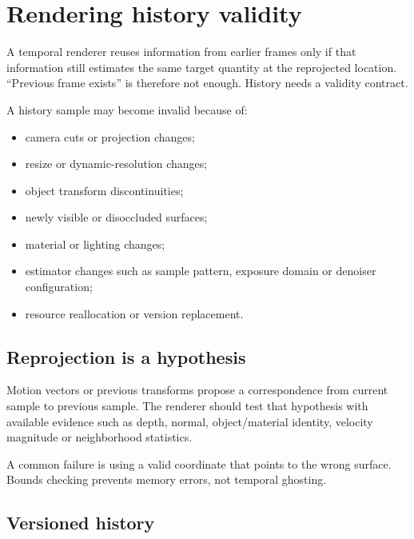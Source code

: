 \hypertarget{appendix-2e7e9fd28a2c}{}\label{referencestart:appendix-2e7e9fd28a2c}
\section{Rendering history validity}\label{appendix-2e7e9fd28a2c-rendering-history-validity}

\hypertarget{appendix-2e7e9fd28a2c-rendering-history-validity}{}

A temporal renderer reuses information from earlier frames only if that information still estimates the same target quantity at the reprojected location. ``Previous frame exists'' is therefore not enough. History needs a validity contract.

A history sample may become invalid because of:

\begin{itemize}
\tightlist
\item
  camera cuts or projection changes;
\item
  resize or dynamic-resolution changes;
\item
  object transform discontinuities;
\item
  newly visible or disoccluded surfaces;
\item
  material or lighting changes;
\item
  estimator changes such as sample pattern, exposure domain or denoiser configuration;
\item
  resource reallocation or version replacement.
\end{itemize}

\subsection{Reprojection is a hypothesis}\label{appendix-2e7e9fd28a2c-reprojection-is-a-hypothesis}

\hypertarget{appendix-2e7e9fd28a2c-reprojection-is-a-hypothesis}{}

Motion vectors or previous transforms propose a correspondence from current sample to previous sample. The renderer should test that hypothesis with available evidence such as depth, normal, object/material identity, velocity magnitude or neighborhood statistics.

A common failure is using a valid coordinate that points to the wrong surface. Bounds checking prevents memory errors, not temporal ghosting.

\subsection{Versioned history}\label{appendix-2e7e9fd28a2c-versioned-history}

